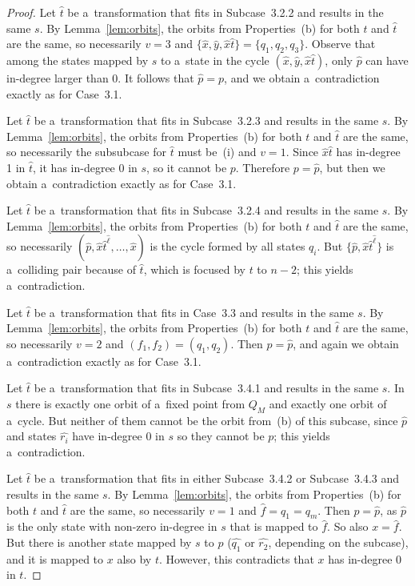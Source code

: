 \documentclass{amsart}
\newcommand{\e}[1]{\hat{#1}}
\begin{document}
\begin{proof}
Let $\e{t}$ be a~transformation that fits in Subcase~3.2.2 and results in the same $s$.
By Lemma~\ref{lem:orbits}, the orbits from Properties~(b) for both $t$ and $\e{t}$ are the same, so necessarily $v=3$ and $\{\e{x},\e{y},\e{x}\e{t}\} = \{q_1,q_2,q_3\}$.
Observe that among the states mapped by $s$ to a~state in the cycle $(\e{x},\e{y},\e{x}\e{t})$, only $\e{p}$ can have in-degree larger than 0.
It follows that $\e{p} = p$, and we obtain a~contradiction exactly as for Case~3.1.

Let $\e{t}$ be a~transformation that fits in Subcase~3.2.3 and results in the same $s$.
By Lemma~\ref{lem:orbits}, the orbits from Properties~(b) for both $t$ and $\e{t}$ are the same, so necessarily the subsubcase for $\e{t}$ must be~(i) and $v=1$.
Since $\e{x}\e{t}$ has in-degree 1 in $\e{t}$, it has in-degree 0 in $s$, so it cannot be $p$.
Therefore $p = \e{p}$, but then we obtain a~contradiction exactly as for Case~3.1.

Let $\e{t}$ be a~transformation that fits in Subcase~3.2.4 and results in the same $s$.
By Lemma~\ref{lem:orbits}, the orbits from Properties~(b) for both $t$ and $\e{t}$ are the same, so necessarily $(\e{p},\e{x}\e{t}^{\e{\ell}},\ldots,\e{x})$ is the cycle formed by all states $q_i$.
But $\{\e{p},\e{x}\e{t}^{\e{\ell}}\}$ is a~colliding pair because of $\e{t}$, which is focused by $t$ to $n-2$; this yields a~contradiction.

Let $\e{t}$ be a~transformation that fits in Case~3.3 and results in the same $s$.
By Lemma~\ref{lem:orbits}, the orbits from Properties~(b) for both $t$ and $\e{t}$ are the same, so necessarily $v=2$ and $(f_1,f_2) = (q_1,q_2)$.
Then $p = \e{p}$, and again we obtain a~contradiction exactly as for Case~3.1.

Let $\e{t}$ be a~transformation that fits in Subcase~3.4.1 and results in the same $s$.
In $s$ there is exactly one orbit of a~fixed point from $Q_M$ and exactly one orbit of a~cycle.
But neither of them cannot be the orbit from~(b) of this subcase, since $\e{p}$ and states $\e{r_i}$ have in-degree 0 in $s$ so they cannot be $p$; this yields a~contradiction.

Let $\e{t}$ be a~transformation that fits in either Subcase~3.4.2 or Subcase~3.4.3 and results in the same $s$.
By Lemma~\ref{lem:orbits}, the orbits from Properties~(b) for both $t$ and $\e{t}$ are the same, so necessarily $v=1$ and $\e{f} = q_1 = q_m$.
Then $p = \e{p}$, as $\e{p}$ is the only state with non-zero in-degree in $s$ that is mapped to $\e{f}$.
So also $x = \e{f}$.
But there is another state mapped by $s$ to $p$ ($\e{q_1}$ or $\e{r_2}$, depending on the subcase), and it is mapped to $x$ also by $t$.
However, this contradicts that $x$ has in-degree 0 in $t$.


\end{proof}
\end{document}
